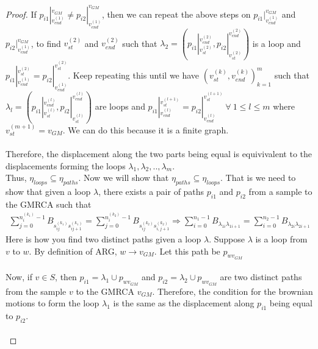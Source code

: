 \begin{proof}
If $p_{i1} |_{v_{end}^{(1)}}^{v_{GM}} \neq p_{i2} |_{v_{end}^{(1)}}^{v_{GM}} $, then we can repeat the above steps on $p_{i1} |_{v_{end}^{(1)}}^{v_{GM}}$ and $p_{i2} |_{v_{end}^{(1)}}^{v_{GM}}$, to find $v_{st}^{(2)}$ and $v_{end}^{(2)}$ such that $\lambda_2 = ( p_{i1}|_{v_{st}^{(2)}}^{v_{end}^{(2)}}, p_{i2}|_{v_{st}^{(2)}}^{v_{end}^{(2)}})$ is a loop and $p_{i1} |_{v_{end}^{(1)}}^{v_{st}^{(2)}} = p_{i2} |_{v_{end}^{(1)}}^{v_{st}^{(2)}} $. Keep repeating this until we have $(v_{st}^{(k)}, v_{end}^{(k)})_{k=1}^m$ such that $\lambda_l = ( p_{i1}|_{v_{st}^{(l)}}^{v_{end}^{(l)}}, p_{i2}|_{v_{st}^{(l)}}^{v_{end}^{(l)}}) $ are loops and $p_{i1} |_{v_{end}^{(l)}}^{v_{st}^{(l+1)}} = p_{i2} |_{v_{end}^{(l)}}^{v_{st}^{(l+1)}} \ \forall \ 1 \leq l \leq m$ where $v_{st}^{(m+1)} = v_{GM}$. We can do this because it is a finite graph. \\ \\
Therefore, the displacement along the two parts being equal is equivivalent to the displacements forming the loops $\lambda_1, \lambda_2,..,\lambda_m$. \\
Thus, $\eta_{loops} \subseteq \eta_{paths}$. \newline
[$\Rightarrow$] Now we will show that $\eta_{paths} \subseteq \eta_{loops}$. That is we need to show that given a loop $\lambda$, there exists a pair of paths $p_{i1}$ and $p_{i2}$ from a sample to the GMRCA such that 
\begin{eqnarray*}
    \displaystyle \sum_{j=0}^{n_i^{(k_1)}-1} B_{s_{ij}^{(k_1)}  s_{ij+1}^{(k_1)} } = \sum_{j=0}^{n_i^{(k_2)}-1} B_{s_{ij}^{(k_2)}  s_{i,j+1}^{(k_2)} } \Rightarrow \sum_{i=0}^{n_1-1} B_{\lambda_{1i} \lambda_{1i+1} } = \sum_{i=0}^{n_2-1} B_{\lambda_{2i} \lambda_{2i+1} } 
\end{eqnarray*}
Here is how you find two distinct paths given a loop $\lambda$. Suppose $\lambda$ is a loop from $v$ to $w$. By definition of ARG, $w \rightarrow v_{GM}$. Let this path be $p_{wv_{GM}}$ \\ \\
Now, if $v \in S$, then $p_{i1} = \lambda_1 \cup p_{wv_{GM}}$ and $p_{i2} = \lambda_2 \cup p_{wv_{GM}}$ are two distinct paths from the sample $v$ to the GMRCA $v_{GM}$. Therefore, the condition for the brownian motions to form the loop $\lambda_1$ is the same as the displacement along $p_{i1}$ being equal to $p_{i2}$. \\ \\

\end{proof}
